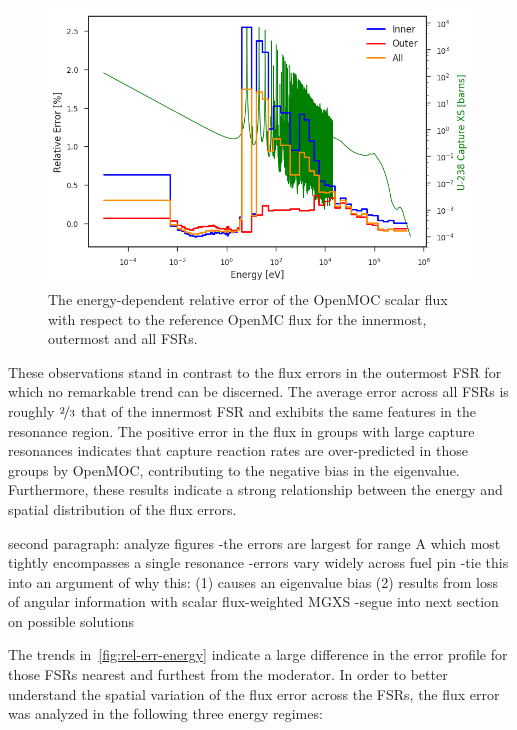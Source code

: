 \begin{figure}[h!]
\centering
\includegraphics[width=\linewidth]{figures/rel-err-inner-outer}
\caption{The energy-dependent relative error of the OpenMOC scalar flux with respect to the reference OpenMC flux for the innermost, outermost and all FSRs.}
\label{fig:rel-err-energy}
\end{figure}

These observations stand in contrast to the flux errors in the outermost FSR for which no remarkable trend can be discerned. The average error across all FSRs is roughly $\nicefrac{2}{3}$ that of the innermost FSR and exhibits the same features in the resonance region. The positive error in the flux in groups with large capture resonances indicates that capture reaction rates are over-predicted in those groups by OpenMOC, contributing to the negative bias in the eigenvalue. Furthermore, these results indicate a strong relationship between the energy and spatial distribution of the flux errors.

second paragraph: analyze figures
-the errors are largest for range A which most tightly encompasses a single resonance
-errors vary widely across fuel pin
-tie this into an argument of why this:
  (1) causes an eigenvalue bias
  (2) results from loss of angular information with scalar flux-weighted MGXS
-segue into next section on possible solutions

The trends in~\autoref{fig:rel-err-energy} indicate a large difference in the error profile for those FSRs nearest and furthest from the moderator. In order to better understand the spatial variation of the flux error across the FSRs, the flux error was analyzed in the following three energy regimes:

